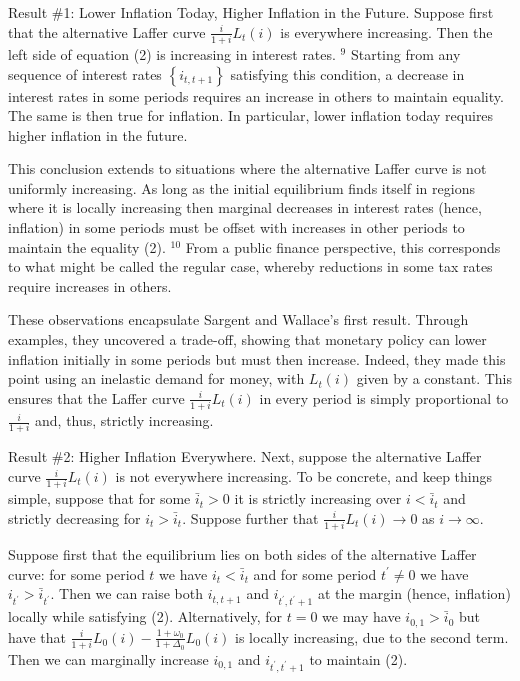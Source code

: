 \documentclass[10pt]{article}
\begin{document}
Result \#1: Lower Inflation Today, Higher Inflation in the Future. Suppose first that the alternative Laffer curve $\frac{i}{1+i} L_{t}(i)$ is everywhere increasing. Then the left side of equation (2) is increasing in interest rates. ${ }^{9}$ Starting from any sequence of interest rates $\left\{i_{t, t+1}\right\}$ satisfying this condition, a decrease in interest rates in some periods requires an increase in others to maintain equality. The same is then true for inflation. In particular, lower inflation today requires higher inflation in the future.

This conclusion extends to situations where the alternative Laffer curve is not uniformly increasing. As long as the initial equilibrium finds itself in regions where it is locally increasing then marginal decreases in interest rates (hence, inflation) in some periods must be offset with increases in other periods to maintain the equality (2). ${ }^{10}$ From a public finance perspective, this corresponds to what might be called the regular case, whereby reductions in some tax rates require increases in others.

These observations encapsulate Sargent and Wallace's first result. Through examples, they uncovered a trade-off, showing that monetary policy can lower inflation initially in some periods but must then increase. Indeed, they made this point using an inelastic demand for money, with $L_{t}(i)$ given by a constant. This ensures that the Laffer curve $\frac{i}{1+i} L_{t}(i)$ in every period is simply proportional to $\frac{i}{1+i}$ and, thus, strictly increasing.

Result \#2: Higher Inflation Everywhere. Next, suppose the alternative Laffer curve $\frac{i}{1+i} L_{t}(i)$ is not everywhere increasing. To be concrete, and keep things simple, suppose that for some $\bar{i}_{t}>0$ it is strictly increasing over $i<\bar{i}_{t}$ and strictly decreasing for $i_{t}>\bar{i}_{t}$. Suppose further that $\frac{i}{1+i} L_{t}(i) \rightarrow 0$ as $i \rightarrow \infty$.

Suppose first that the equilibrium lies on both sides of the alternative Laffer curve: for some period $t$ we have $i_{t}<\bar{i}_{t}$ and for some period $t^{\prime} \neq 0$ we have $i_{t^{\prime}}>\bar{i}_{t^{\prime}}$. Then we can raise both $i_{t, t+1}$ and $i_{t^{\prime}, t^{\prime}+1}$ at the margin (hence, inflation) locally while satisfying (2). Alternatively, for $t=0$ we may have $i_{0,1}>\bar{i}_{0}$ but have that $\frac{i}{1+i} L_{0}(i)-\frac{1+\omega_{0}}{1+\Delta_{0}} L_{0}(i)$ is locally increasing, due to the second term. Then we can marginally increase $i_{0,1}$ and $i_{t^{\prime}, t^{\prime}+1}$ to maintain (2).
\end{document}

